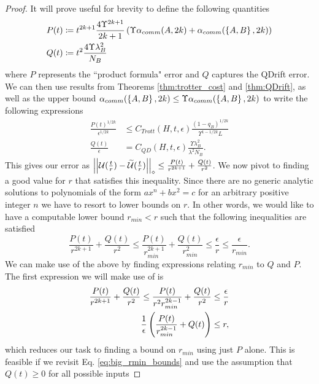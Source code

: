 \begin{proof}
It will prove useful for brevity to define the following quantities
\begin{align}
    P(t) &\coloneqq t^{2k+1} \frac{4 \Upsilon^{2k+1}}{2k+1}\left( \Upsilon \alpha_{comm}(A,2k) + \alpha_{comm}(\left\{ A,B \right\},2k) \right) \label{def:p_of_t} \\
    Q(t) &\coloneqq t^2 \frac{4 \Upsilon \lambda_B^2}{N_B} \label{def:q_of_t} \\
\end{align}
where $P$ represents the ``product formula" error and $Q$ captures the QDrift error. We can then use results from Theorems \ref{thm:trotter_cost} and \ref{thm:QDrift}, as well as the upper bound $\alpha_{comm}(\left\{ A,B \right\}, 2k) \leq \Upsilon \alpha_{comm}(\left\{ A,B \right\}, 2k)$ to write the following expressions
\begin{align}
    \frac{P(t)^{1/2k}}{\epsilon^{1/2k}} &\leq C_{Trott}(H, t, \epsilon) \frac{(1-q_B)^{1/2k}}{\Upsilon^{1 - 1/2k}L} \\
    \frac{Q(t)}{\epsilon} &= C_{QD}(H, t, \epsilon) \frac{\Upsilon \lambda_B^2}{\lambda^2 N_B}.
\end{align}
This gives our error as $\left| \left| \mathcal{U}(\frac{t}{r}) - \widetilde{\mathcal{U}}(\frac{t}{r}) \right| \right|_\diamond \leq \frac{P(t)}{r^{2k+1}} + \frac{Q(t)}{r^2}$. We now pivot to finding a good value for $r$ that satisfies this inequality. Since there are no generic analytic solutions to polynomials of the form $a x^n + b x^2 = c$ for an arbitrary positive integer $n$ we have to resort to lower bounds on $r$. In other words, we would like to have a computable lower bound $r_{min} < r$ such that the following inequalities are satisfied
\begin{equation}
    \frac{P(t)}{r^{2k+1}} + \frac{Q(t)}{r^2} \leq \frac{P(t)}{r_{min}^{2k+1}} + \frac{Q(t)}{r_{min}^2} \leq \frac{\epsilon}{r} \leq \frac{\epsilon}{r_{min}}. \label{eq:big_rmin_bounds}
\end{equation}
We can make use of the above by finding expressions relating $r_{min}$ to $Q$ and $P$. The first expression we will make use of is
\begin{align}
    \frac{P(t)}{r^{2k+1}} + \frac{Q(t)}{r^2} \leq \frac{P(t)}{r^2 r_{min}^{2k-1}} + \frac{Q(t)}{r^2} &\leq \frac{\epsilon}{r} \\
    \frac{1}{\epsilon} \left( \frac{P(t)}{r_{min}^{2k-1}} + Q(t) \right) &\leq r, \label{eq:intermediate_rmin_bound}
\end{align}
which reduces our task to finding a bound on $r_{min}$ using just $P$ alone. This is feasible if we revisit Eq. \ref{eq:big_rmin_bounds} and use the assumption that $Q(t) \geq 0$ for all possible inputs

\end{proof}
